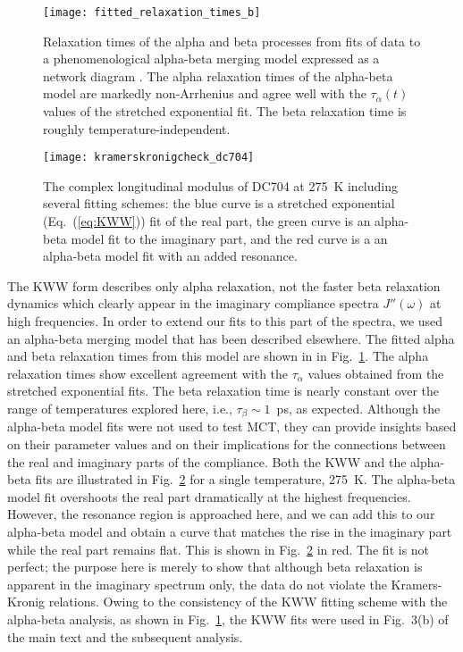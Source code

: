 \documentclass[reprint,showpacs,amsmath,amssymb,aip,jcp]{revtex4-1}
\begin{document}
\begin{figure}\centering
  \texttt{[image: fitted\_relaxation\_times\_b]}
  \caption{\label{fig:alphabeta} Relaxation times of the alpha and
    beta processes from fits of data to a phenomenological
    alpha-beta merging model expressed as a network diagram
    \cite{sSaglanmak2010,sJakobsen2012}. The alpha relaxation times of
    the alpha-beta model are markedly non-Arrhenius and agree well
    with the $\tau_{\alpha}(t)$ values of the stretched exponential fit. The
    beta relaxation time is roughly temperature-independent.}
\end{figure}



\begin{figure}
  \texttt{[image: kramerskronigcheck\_dc704]}
  \caption{ \label{fig:kramerskronigcheck_dc704}The complex
    longitudinal modulus of DC704 at 275~K including several fitting
    schemes: the blue curve is a stretched exponential (Eq.\
    (\ref{eq:KWW})) fit of the real part, the green curve is an
    alpha-beta model fit \cite{sSaglanmak2010,sJakobsen2011a} to the
    imaginary part, and the red curve is a an alpha-beta model fit
    with an added resonance.}
\end{figure}
   
The KWW form describes only alpha relaxation, not the faster beta
relaxation dynamics which clearly appear in the imaginary compliance
spectra $J''(\omega)$ at high frequencies. In order to extend our fits
to this part of the spectra, we used an alpha-beta merging model that
has been described elsewhere\cite{sSaglanmak2010,sJakobsen2011a}. The
fitted alpha and beta relaxation times from this model are shown in in
Fig.~\ref{fig:alphabeta}. The alpha relaxation times show excellent
agreement with the $\tau_\alpha$ values obtained from the stretched
exponential fits. The beta relaxation time is nearly constant over the
range of temperatures explored here, i.e., $\tau_\beta\sim1$~ps, as
expected. Although the alpha-beta model fits were not used to test
MCT, they can provide insights based on their parameter values and on
their implications for the connections between the real and imaginary
parts of the compliance. Both the KWW and the alpha-beta fits are
illustrated in Fig.~\ref{fig:kramerskronigcheck_dc704} for a single
temperature, 275~K. The alpha-beta model fit overshoots the real part
dramatically at the highest frequencies. However, the resonance region
is approached here, and we can add this to our alpha-beta model and
obtain a curve that matches the rise in the imaginary part while the
real part remains flat. This is shown in Fig.\
\ref{fig:kramerskronigcheck_dc704} in red. The fit is not perfect; the
purpose here is merely to show that although beta relaxation is
apparent in the imaginary spectrum only, the data do not violate the
Kramers-Kronig relations. Owing to the consistency of the KWW fitting
scheme with the alpha-beta analysis, as shown in
Fig.~\ref{fig:alphabeta}, the KWW fits were used in Fig.\ 3(b) of the
main text and the subsequent analysis.
\end{document}
